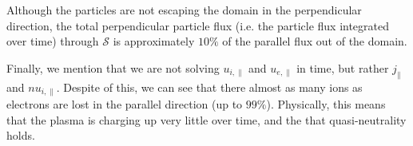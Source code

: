 Although the particles are not escaping the domain in the perpendicular direction, the total perpendicular particle flux (i.e. the particle flux integrated over time) through $\mathcal{S}$
is approximately $10\%$ of the parallel flux out of the domain.

Finally, we mention that we are not solving $u_{i,\|}$ and $u_{e,\|}$ in time, but rather $j_{\|}$ and $nu_{i,\|}$.
Despite of this, we can see that there almost as many ions as electrons are lost in the parallel direction (up to $99\%$).
Physically, this means that the plasma is charging up very little over time, and the that quasi-neutrality holds.
